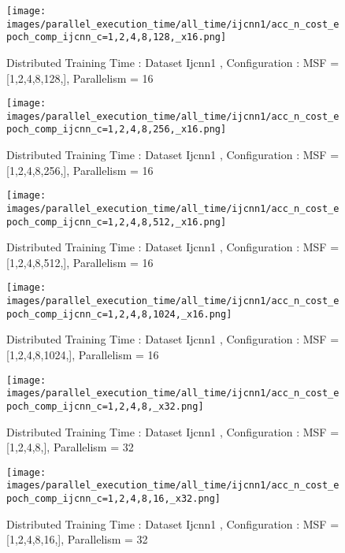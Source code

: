 \begin{figure*}[htbp]
\centering
\texttt{[image: images/parallel\_execution\_time/all\_time/ijcnn1/acc\_n\_cost\_epoch\_comp\_ijcnn\_c=1,2,4,8,128,\_x16.png]}
\caption{Distributed Training Time : Dataset Ijcnn1 , Configuration : MSF = [1,2,4,8,128,], Parallelism = 16}
\label{fig:dis-msf-tr-time-ijcnn1-x16}
\end{figure*}


\begin{figure*}[htbp]
\centering
\texttt{[image: images/parallel\_execution\_time/all\_time/ijcnn1/acc\_n\_cost\_epoch\_comp\_ijcnn\_c=1,2,4,8,256,\_x16.png]}
\caption{Distributed Training Time : Dataset Ijcnn1 , Configuration : MSF = [1,2,4,8,256,], Parallelism = 16}
\label{fig:dis-msf-tr-time-ijcnn1-x16}
\end{figure*}


\begin{figure*}[htbp]
\centering
\texttt{[image: images/parallel\_execution\_time/all\_time/ijcnn1/acc\_n\_cost\_epoch\_comp\_ijcnn\_c=1,2,4,8,512,\_x16.png]}
\caption{Distributed Training Time : Dataset Ijcnn1 , Configuration : MSF = [1,2,4,8,512,], Parallelism = 16}
\label{fig:dis-msf-tr-time-ijcnn1-x16}
\end{figure*}


\begin{figure*}[htbp]
\centering
\texttt{[image: images/parallel\_execution\_time/all\_time/ijcnn1/acc\_n\_cost\_epoch\_comp\_ijcnn\_c=1,2,4,8,1024,\_x16.png]}
\caption{Distributed Training Time : Dataset Ijcnn1 , Configuration : MSF = [1,2,4,8,1024,], Parallelism = 16}
\label{fig:dis-msf-tr-time-ijcnn1-x16}
\end{figure*}


\begin{figure*}[htbp]
\centering
\texttt{[image: images/parallel\_execution\_time/all\_time/ijcnn1/acc\_n\_cost\_epoch\_comp\_ijcnn\_c=1,2,4,8,\_x32.png]}
\caption{Distributed Training Time : Dataset Ijcnn1 , Configuration : MSF = [1,2,4,8,], Parallelism = 32}
\label{fig:dis-msf-tr-time-ijcnn1-x32}
\end{figure*}


\begin{figure*}[htbp]
\centering
\texttt{[image: images/parallel\_execution\_time/all\_time/ijcnn1/acc\_n\_cost\_epoch\_comp\_ijcnn\_c=1,2,4,8,16,\_x32.png]}
\caption{Distributed Training Time : Dataset Ijcnn1 , Configuration : MSF = [1,2,4,8,16,], Parallelism = 32}
\label{fig:dis-msf-tr-time-ijcnn1-x32}
\end{figure*}


